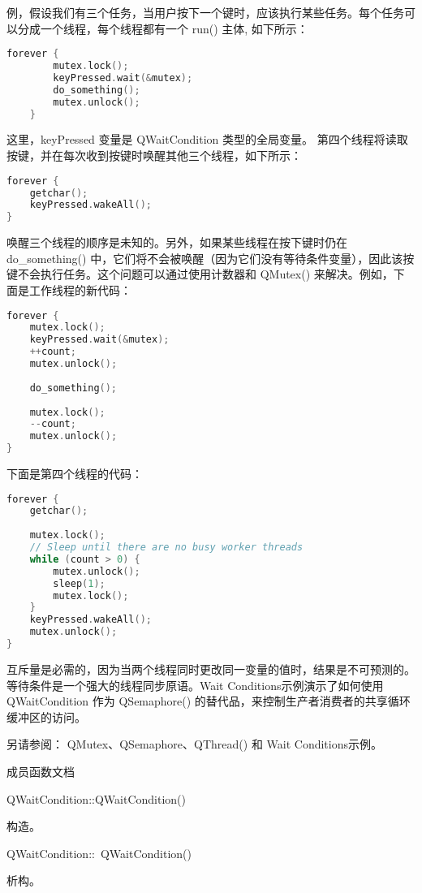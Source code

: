 例，假设我们有三个任务，当用户按下一个键时，应该执行某些任务。每个任务可以分成一个线程，每个线程都有一个 run() 主体, 如下所示：

\begin{lstlisting}[language=C++]
	forever {
		mutex.lock();
		keyPressed.wait(&mutex);
		do_something();
		mutex.unlock();
	}
\end{lstlisting}

这里，keyPressed 变量是 QWaitCondition 类型的全局变量。
第四个线程将读取按键，并在每次收到按键时唤醒其他三个线程，如下所示：

\begin{lstlisting}[language=C++]
forever {
	getchar();
	keyPressed.wakeAll();
}
\end{lstlisting}

唤醒三个线程的顺序是未知的。另外，如果某些线程在按下键时仍在 do\_something() 中，它们将不会被唤醒（因为它们没有等待条件变量），因此该按键不会执行任务。这个问题可以通过使用计数器和 QMutex() 来解决。例如，下面是工作线程的新代码：

\begin{lstlisting}[language=C++]
forever {
	mutex.lock();
	keyPressed.wait(&mutex);
	++count;
	mutex.unlock();
	
	do_something();
	
	mutex.lock();
	--count;
	mutex.unlock();
}
\end{lstlisting}

下面是第四个线程的代码：

\begin{lstlisting}[language=C++]
forever {
	getchar();
	
	mutex.lock();
	// Sleep until there are no busy worker threads
	while (count > 0) {
		mutex.unlock();
		sleep(1);
		mutex.lock();
	}
	keyPressed.wakeAll();
	mutex.unlock();
}
\end{lstlisting}

互斥量是必需的，因为当两个线程同时更改同一变量的值时，结果是不可预测的。
等待条件是一个强大的线程同步原语。Wait Conditions示例演示了如何使用 QWaitCondition 作为 QSemaphore() 的替代品，来控制生产者消费者的共享循环缓冲区的访问。

另请参阅： QMutex、QSemaphore、QThread() 和 Wait Conditions示例。

成员函数文档

QWaitCondition::QWaitCondition()

构造。

QWaitCondition::~QWaitCondition()

析构。

